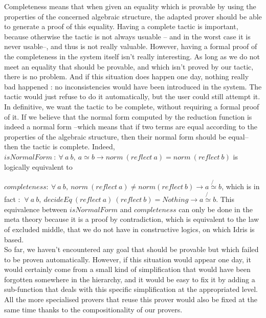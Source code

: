 Completeness means that when given an equality which is provable by using the properties of the concerned algebraic structure, the adapted prover should be able to generate a proof of this equality. Having a complete tactic is important, because otherwise the tactic is not always usuable -- and in the worst case it is never usable--, and thus is not really valuable. However, having a formal proof of the completeness in the system itself isn't really interesting. As long as we do not meet an equality that should be provable, and which isn't proved by our tactic, there is no problem. And if this situation does happen one day, nothing really bad happened : no inconsistencies would have been introduced in the system. The tactic would just refuse to do it automatically, but the user could still attempt it. \\

In definitive, we want the tactic to be complete, without requiring a formal proof of it. If we believe that the normal form computed by the reduction function is indeed a normal form --which means that if two terms are equal according to the properties of the algebraic structure, then their normal form should be equal-- then the tactic is complete.
Indeed, 
$isNormalForm\ :\ \forall\ a\ b,\ a \simeq b \rightarrow norm\ (reflect\ a) = norm\ (reflect\ b)$ is logically equivalent to

$completeness : \ \forall\ a\ b,\ norm\ (reflect\ a) \neq norm(reflect\ b) \rightarrow a \not{\simeq} b$, which is in fact :
$\ \forall\ a\ b,\ decideEq\ (reflect\ a)\ (reflect\ b) = Nothing \rightarrow a \not{\simeq} b$.
This equivalence between $isNormalForm$ and $completeness$ can only be done in the meta theory because it is a proof by contradiction, which is equivalent to the law of excluded middle, that we do not have in constructive logics, on which Idris is based.
\\

So far, we haven't encountered any goal that should be provable but which failed to be proven automatically. However, if this situation would appear one day, it would certainly come from a small kind of simplification that would have been forgotten somewhere in the hierarchy, and it would be easy to fix it by adding a sub-function that deals with this specific simplification at the appropriated level. All the more specialised provers that reuse this prover would also be fixed at the same time thanks to the compositionality of our provers. 
\\

